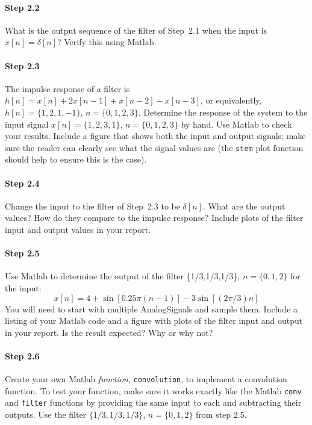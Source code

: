 \paragraph{Step 2.2} What is the output sequence of the filter of
	Step~2.1 when the input is $x[n] = \delta[n]$? Verify this
        using Matlab.


\paragraph{Step 2.3} The impulse response of a filter is $h[n]
        = x[n] + 2x[n-1] + x[n-2] - x[n-3]$, or equivalently,
        $h[n]=\{1,2,1,-1\}$, $n=\{0, 1, 2, 3\}$. Determine the
        response of the system to the input signal $x[n]=\{1,2,3,1\}$,
        $n=\{0, 1,2,3\}$ by hand. Use Matlab to check your
        results. Include a figure that shows both the input and output
        signals; make sure the reader can clearly see what the signal
        values are (the \verb|stem| plot function should help to
        ensure this is the case).

\paragraph{Step 2.4} Change the input to the filter of
        Step~2.3 to be $\delta[n]$. What are the output values? How do
        they compare to the impulse response? Include plots of the
        filter input and output values in your report.


\paragraph{Step 2.5} Use Matlab to determine the output of the
        filter \{1/3,1/3,1/3\}, $n=\{0,1,2\}$ for the input:
	\begin{equation}
	  x[n] = 4 + \sin[0.25\pi(n-1)] - 3 \sin[(2\pi/3)n]  
	\end{equation}
        You will need to start with multiple AnalogSignals and sample
        them. Include a listing of your Matlab code and a figure with
        plots of the filter input and output in your report. Is the
        result expected? Why or why not?
	
	

\paragraph{Step 2.6} Create your own Matlab \emph{function},
        \verb|convolution|, to implement a convolution function.  To
        test your function, make sure it works exactly like the Matlab
        \verb|conv| and \verb|filter| functions by providing the same
        input to each and subtracting their outputs. Use the filter
        $\{1/3,1/3,1/3\}$, $n=\{0,1,2\}$ from step 2.5.
	

